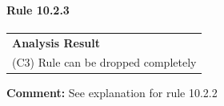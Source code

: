 \paragraph{Rule 10.2.3}
\begin{longtable}{p{13cm}}
\textbf{Analysis Result} \\
(C3) Rule can be dropped completely \\
\end{longtable}
\textbf{Comment:} See explanation for rule 10.2.2 \\
